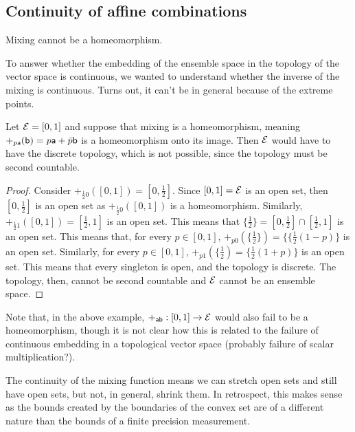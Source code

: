\subsection{Continuity of affine combinations}

\begin{insight}
	Mixing cannot be a homeomorphism.
\end{insight}

To answer whether the embedding of the ensemble space in the topology of the vector space is continuous, we wanted to understand whether the inverse of the mixing is continuous. Turns out, it can't be in general because of the extreme points.

\begin{prop}
	Let $\Ens = [0,1]$ and suppose that mixing is a homeomorphism, meaning $+_{p \ens[a]}(\ens[b]) = p\ens[a] + \bar{p}\ens[b]$ is a homeomorphism onto its image. Then $\Ens$ would have to have the discrete topology, which is not possible, since the topology must be second countable.
\end{prop}

\begin{proof}
	Consider $+_{\frac{1}{2}0}([0,1])= [0,\frac{1}{2}]$. Since $[0,1] = \Ens$ is an open set, then $[0,\frac{1}{2}]$ is an open set as $+_{\frac{1}{2}0}([0,1])$ is a homeomorphism. Similarly, $+_{\frac{1}{2}1}([0,1])= [\frac{1}{2},1]$ is an open set. This means that $\{\frac{1}{2}\} = [0,\frac{1}{2}] \cap [\frac{1}{2},1]$ is an open set. This means that, for every $p \in [0,1]$, $+_{p0}(\{\frac{1}{2}\})= \{\{\frac{1}{2}(1-p)\}$ is an open set. Similarly, for every $p \in [0,1]$, $+_{p1}(\{\frac{1}{2})= \{\frac{1}{2}(1+p)\}$ is an open set. This means that every singleton is open, and the topology is discrete. The topology, then, cannot be second countable and $\Ens$ cannot be an ensemble space.
\end{proof}

Note that, in the above example, $+_{\ens[a]\ens[b]} : [0,1] \to \Ens$ would also fail to be a homeomorphism, though it is not clear how this is related to the failure of continuous embedding in a topological vector space (probably failure of scalar multiplication?).

The continuity of the mixing function means we can stretch open sets and still have open sets, but not, in general, shrink them. In retrospect, this makes sense as the bounds created by the boundaries of the convex set are of a different nature than the bounds of a finite precision measurement.

